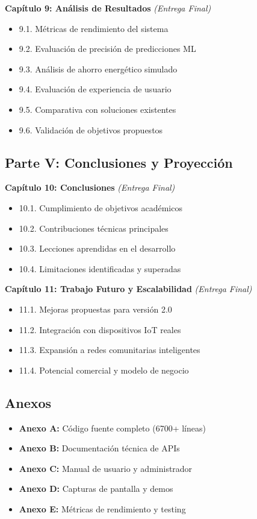 \documentclass[12pt,a4paper,spanish]{article}
\begin{document}
\textbf{Capítulo 9: Análisis de Resultados} \textit{(Entrega Final)}
\begin{itemize}
    \item 9.1. Métricas de rendimiento del sistema
    \item 9.2. Evaluación de precisión de predicciones ML
    \item 9.3. Análisis de ahorro energético simulado
    \item 9.4. Evaluación de experiencia de usuario
    \item 9.5. Comparativa con soluciones existentes
    \item 9.6. Validación de objetivos propuestos
\end{itemize}

\subsection{Parte V: Conclusiones y Proyección}

\textbf{Capítulo 10: Conclusiones} \textit{(Entrega Final)}
\begin{itemize}
    \item 10.1. Cumplimiento de objetivos académicos
    \item 10.2. Contribuciones técnicas principales
    \item 10.3. Lecciones aprendidas en el desarrollo
    \item 10.4. Limitaciones identificadas y superadas
\end{itemize}

\textbf{Capítulo 11: Trabajo Futuro y Escalabilidad} \textit{(Entrega Final)}
\begin{itemize}
    \item 11.1. Mejoras propuestas para versión 2.0
    \item 11.2. Integración con dispositivos IoT reales
    \item 11.3. Expansión a redes comunitarias inteligentes
    \item 11.4. Potencial comercial y modelo de negocio
\end{itemize}

\subsection{Anexos}

\begin{itemize}
    \item \textbf{Anexo A:} Código fuente completo (6700+ líneas)
    \item \textbf{Anexo B:} Documentación técnica de APIs
    \item \textbf{Anexo C:} Manual de usuario y administrador
    \item \textbf{Anexo D:} Capturas de pantalla y demos
    \item \textbf{Anexo E:} Métricas de rendimiento y testing
\end{itemize}
\end{document}
